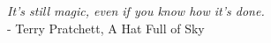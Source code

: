 
\null\vfill\null
\hfill\parbox{110mm}{
  \raggedleft
    \emph{It's still magic, even if you know how it's done.}\\[5pt]
  - Terry Pratchett, A Hat Full of Sky
}
\null\vfill\null